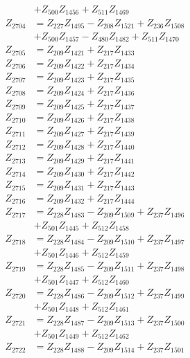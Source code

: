 \begin{multicols}{2}
\begin{align}
&+ Z_{500}Z_{1456} + Z_{511}Z_{1469} \nonumber \\
Z_{2704} &= Z_{227}Z_{1495} - Z_{208}Z_{1521} + Z_{236}Z_{1508}  \nonumber \\
&+ Z_{500}Z_{1457} - Z_{480}Z_{1482} + Z_{511}Z_{1470} \nonumber \\
Z_{2705} &= Z_{209}Z_{1421} + Z_{217}Z_{1433} \nonumber \\
Z_{2706} &= Z_{209}Z_{1422} + Z_{217}Z_{1434} \nonumber \\
Z_{2707} &= Z_{209}Z_{1423} + Z_{217}Z_{1435} \nonumber \\
Z_{2708} &= Z_{209}Z_{1424} + Z_{217}Z_{1436} \nonumber \\
Z_{2709} &= Z_{209}Z_{1425} + Z_{217}Z_{1437} \nonumber \\
Z_{2710} &= Z_{209}Z_{1426} + Z_{217}Z_{1438} \nonumber \\
Z_{2711} &= Z_{209}Z_{1427} + Z_{217}Z_{1439} \nonumber \\
Z_{2712} &= Z_{209}Z_{1428} + Z_{217}Z_{1440} \nonumber \\
Z_{2713} &= Z_{209}Z_{1429} + Z_{217}Z_{1441} \nonumber \\
Z_{2714} &= Z_{209}Z_{1430} + Z_{217}Z_{1442} \nonumber \\
Z_{2715} &= Z_{209}Z_{1431} + Z_{217}Z_{1443} \nonumber \\
Z_{2716} &= Z_{209}Z_{1432} + Z_{217}Z_{1444} \nonumber \\
Z_{2717} &= Z_{228}Z_{1483} - Z_{209}Z_{1509} + Z_{237}Z_{1496}  \nonumber \\
&+ Z_{501}Z_{1445} + Z_{512}Z_{1458} \nonumber \\
Z_{2718} &= Z_{228}Z_{1484} - Z_{209}Z_{1510} + Z_{237}Z_{1497}  \nonumber \\
&+ Z_{501}Z_{1446} + Z_{512}Z_{1459} \nonumber \\
Z_{2719} &= Z_{228}Z_{1485} - Z_{209}Z_{1511} + Z_{237}Z_{1498}  \nonumber \\
&+ Z_{501}Z_{1447} + Z_{512}Z_{1460} \nonumber \\
Z_{2720} &= Z_{228}Z_{1486} - Z_{209}Z_{1512} + Z_{237}Z_{1499}  \nonumber \\
&+ Z_{501}Z_{1448} + Z_{512}Z_{1461} \nonumber \\
Z_{2721} &= Z_{228}Z_{1487} - Z_{209}Z_{1513} + Z_{237}Z_{1500}  \nonumber \\
&+ Z_{501}Z_{1449} + Z_{512}Z_{1462} \nonumber \\
Z_{2722} &= Z_{228}Z_{1488} - Z_{209}Z_{1514} + Z_{237}Z_{1501}  \nonumber \\

\end{align}
\end{multicols}
